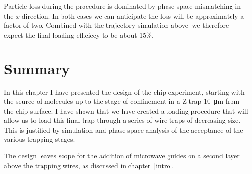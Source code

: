 Particle loss during the procedure is dominated by phase-space mismatching in
the $x$ direction. In both cases we can anticipate the loss will be
approximately a factor of two. Combined with the trajectory simulation above,
we therefore expect the final loading efficiecy to be about 15\%.

\section{Summary}

In this chapter I have presented the design of the chip experiment, starting
with the source of molecules up to the stage of confinement in a Z-trap
\SI{10}{\micro\meter} from the chip surface. I have shown that we have created
a loading procedure that will allow us to load this final trap through a series
of wire traps of decreasing size. This is justified by simulation and
phase-space analysis of the acceptance of the various trapping stages.

The design leaves scope for the addition of microwave guides on a second layer
above the trapping wires, as discussed in chapter~\ref{intro}.
